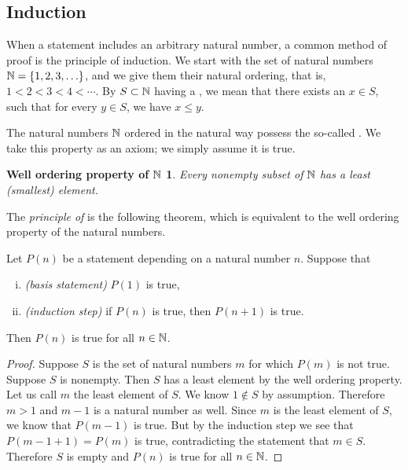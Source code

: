 \subsection{Induction}

When a statement includes an arbitrary natural number,
a common method of proof is the principle of induction.  
We start with the set of natural numbers ${\mathbb{N}} = \{ 1,2,3,\ldots \}$, and we
give them their natural ordering, 
that is, $1 < 2 < 3 < 4 < \cdots$.
By $S \subset {\mathbb{N}}$ having a \emph{}, we mean that
there exists an $x \in S$,
such that for every
$y \in S$, we have $x \leq y$.

The natural numbers ${\mathbb{N}}$ ordered in the natural way
possess the so-called \emph{}.
We take this property
as an axiom; we simply assume it is true.

\theoremstyle{plain}
\newtheorem*{wellordprop}{Well ordering property of ${\mathbb{N}}$}
\hypertarget{wop:link}{}%
\begin{wellordprop}
Every nonempty subset of ${\mathbb{N}}$ has a least (smallest) element.
\end{wellordprop}

The \emph{principle of } is
the following theorem, which is equivalent to the well ordering property of
the natural numbers.

\begin{thm} \label{induction:thm}
Let $P(n)$ be a statement depending on a natural number $n$.  Suppose that
\begin{enumerate}[(i)]
\item \emph{(basis statement)} $P(1)$ is true,
\item \emph{(induction step)} if $P(n)$ is true, then $P(n+1)$ is true.
\end{enumerate}
Then $P(n)$ is true for all $n \in {\mathbb{N}}$.
\end{thm}

\begin{proof}
Suppose $S$ is the set of natural numbers $m$ for which $P(m)$ is
not true.  Suppose
$S$ is nonempty.  Then $S$ has a least element by the well ordering
property.  Let us call $m$ the least element of $S$.  We know $1 \notin
S$ by assumption.  Therefore $m > 1$ and $m-1$ is a natural number as well.
Since $m$ is the least element of $S$, we know that $P(m-1)$ is true.
But by the induction step we see that $P(m-1+1) = P(m)$ is true, 
contradicting the statement that $m \in S$.  Therefore $S$ is empty and 
$P(n)$ is true for all $n \in {\mathbb{N}}$.
\end{proof}

